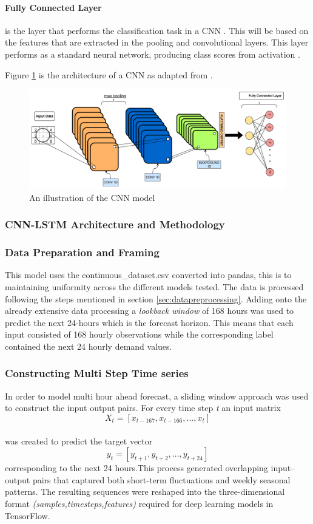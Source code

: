 \paragraph{Fully Connected Layer} is the layer that performs the classification task in a CNN \cite{IBM_WhatAreCNNs_2025}. This will be based on the features that are extracted in the pooling and convolutional layers. This layer performs as a standard neural network, producing class scores from activation \cite{o2015introduction}.

Figure \ref{fig:cnn} is the architecture of a CNN as adapted from \cite{o2015introduction}.
\begin{figure}[H]
	\centering
	\includegraphics[width=0.7\linewidth]{Chapters/images/CNN}
	\caption{An illustration of the CNN model}
	\label{fig:cnn}
\end{figure}


\subsubsection{CNN-LSTM Architecture and Methodology}

\subsubsection{Data Preparation and Framing}
This model uses the continuous\_dataset.csv converted into pandas, this is to maintaining uniformity across the different models tested. The data is processed following the steps mentioned in section \ref{sec:datapreprocessing}. Adding onto the already extensive data processing a \textit{lookback window} of 168 hours was used to predict the next 24-hours which is the forecast horizon. This means that each input consisted of 168 hourly observations while the corresponding label contained the next 24 hourly demand values.

\subsubsection{Constructing Multi Step Time series}
In order to model multi hour ahead forecast, a sliding window approach was used to construct the input output pairs. For every time step \textit{t} an input matrix\\ \[
X_t =[x_{t-167},x_{t-166}, ... , x_t]
\] \\
 was created to predict the target vector \\
 \[
 y_t = [y_{t+1},y_{t+2}, ... , y_{t+24}] 
 \]
corresponding to the next 24 hours.This process generated overlapping input–output pairs that captured both short-term fluctuations and weekly seasonal patterns. The resulting sequences were reshaped into the three-dimensional format 
\textit{(samples,timesteps,features)} required for deep learning models in TensorFlow.
